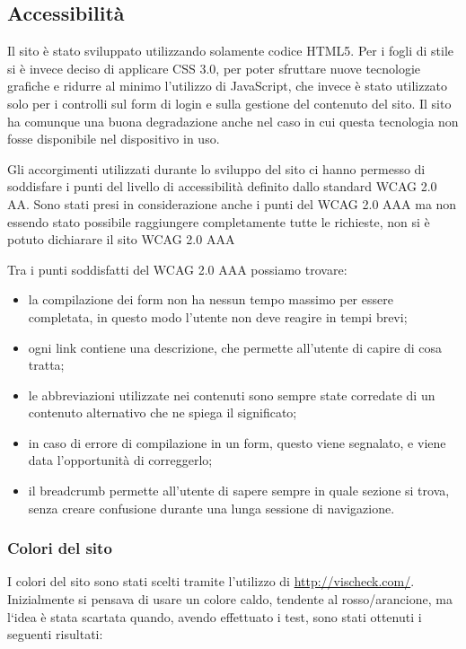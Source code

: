 \graphicspath{ {res/img/} }

\subsection{Accessibilità}
Il sito è stato sviluppato utilizzando solamente codice HTML5. Per i fogli di stile si è invece deciso di applicare CSS 3.0, per poter sfruttare nuove tecnologie grafiche e ridurre al minimo l'utilizzo di JavaScript, che invece è stato utilizzato solo per i controlli sul form di login e sulla gestione del contenuto del sito. Il sito ha comunque una buona degradazione anche nel caso in cui questa tecnologia non fosse disponibile nel dispositivo in uso.

Gli accorgimenti utilizzati durante lo sviluppo del sito ci hanno permesso di soddisfare i punti del livello di accessibilità definito dallo standard WCAG 2.0 AA. Sono stati presi in considerazione anche i punti del WCAG 2.0 AAA ma non essendo stato possibile raggiungere completamente tutte le richieste, non si è potuto dichiarare il sito WCAG 2.0 AAA

Tra i punti soddisfatti del WCAG 2.0 AAA possiamo trovare:
\begin{itemize}

	\item la compilazione dei form non ha nessun tempo massimo per essere completata, in questo modo l'utente non deve reagire in tempi brevi;
	\item ogni link contiene una descrizione, che permette all'utente di capire di cosa tratta;
	\item le abbreviazioni utilizzate nei contenuti sono sempre state corredate di un contenuto alternativo che ne spiega il significato;
	\item in caso di errore di compilazione in un form, questo viene segnalato, e viene data l'opportunit\`a di correggerlo;
	\item il breadcrumb permette all'utente di sapere sempre in quale sezione si trova, senza creare confusione durante una lunga sessione di navigazione.

\end{itemize}

\subsubsection{Colori del sito}
I colori del sito sono stati scelti tramite l'utilizzo di \url{http://vischeck.com/}. Inizialmente si pensava di usare un colore caldo, tendente al rosso/arancione, ma l`idea \`e stata scartata quando, avendo effettuato i test, sono stati ottenuti i seguenti risultati:

